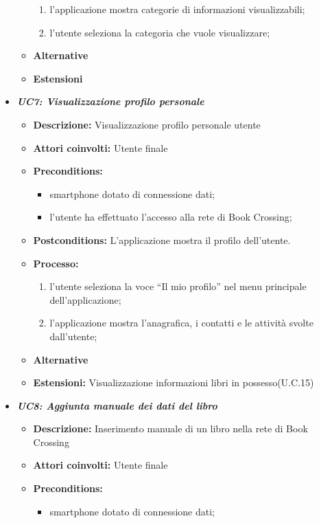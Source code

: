 \begin{itemize}
\begin{itemize}
\begin{enumerate}
			\item l’applicazione mostra categorie di informazioni visualizzabili;
			\item l’utente seleziona la categoria che vuole visualizzare;
		\end{enumerate}
		\item \textbf{Alternative}
		\item \textbf{Estensioni}
	\end{itemize}
	\item \textbf{\textit{UC7: Visualizzazione profilo personale}}
	\begin{itemize}
		\item \textbf{Descrizione: } Visualizzazione profilo personale utente
		\item \textbf{Attori coinvolti:} Utente finale
		\item \textbf{Preconditions:}
		\begin{itemize}
			\item smartphone dotato di connessione dati;
			\item l’utente ha effettuato l’accesso alla rete di Book Crossing;
		\end{itemize}
		\item \textbf{Postconditions: }L’applicazione mostra il profilo dell’utente.
		\item \textbf{Processo: }
		\begin{enumerate}
			\item l’utente seleziona la voce “Il mio profilo” nel menu principale dell’applicazione;
			\item l’applicazione mostra l’anagrafica, i contatti e le attività svolte dall’utente;
		\end{enumerate}
		\item \textbf{Alternative}
		\item \textbf{Estensioni: } Visualizzazione informazioni libri in possesso(U.C.15)
	\end{itemize}
	\item \textbf{\textit{UC8: Aggiunta manuale dei dati del libro}}
	\begin{itemize}
		\item \textbf{Descrizione:} Inserimento manuale di un libro nella rete di Book Crossing
		\item \textbf{Attori coinvolti:} Utente finale
		\item \textbf{Preconditions:}
		\begin{itemize}
			\item smartphone dotato di connessione dati;

\end{itemize}
\end{itemize}
\end{itemize}
